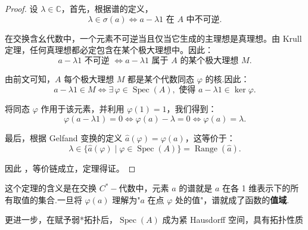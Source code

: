 \documentclass[math-font=lm, text-font=lm, math-style=TeX]{sjtureport}
\theoremstyle{plain}
\newtheorem*{proof}{证明}
\theoremstyle{plain}
\DeclareMathOperator{\Spec}{Spec}
\begin{document}
\begin{proof}
    设 $\lambda \in \mathbb{C}$，首先，根据谱的定义，
    \begin{equation*}
        \lambda \in \sigma(a) \Longleftrightarrow a - \lambda 1 \text{ 在 } A \text{ 中不可逆}.
    \end{equation*}
    
    在交换含幺代数中，一个元素不可逆当且仅当它生成的主理想是真理想。由 Krull 定理，任何真理想都必定包含在某个极大理想中。因此：
    \begin{equation*}
        a - \lambda 1 \text{ 不可逆 } \Longleftrightarrow a - \lambda 1 \text{ 属于 } A \text{ 的某个极大理想 } M.
    \end{equation*}

    由前文可知，$A$ 每个极大理想 $M$ 都是某个代数同态 $\varphi$ 的核.因此：
    \begin{equation*}
        a - \lambda 1 \in M \Longleftrightarrow \exists\, \varphi \in \Spec(A), \text{ 使得 } a - \lambda 1 \in \ker\varphi.
    \end{equation*}

    将同态 $\varphi$ 作用于该元素，并利用 $\varphi(1) = 1$，我们得到：
    \begin{equation*}
        \varphi(a - \lambda 1) = 0 \Longleftrightarrow \varphi(a) - \lambda = 0 \Longleftrightarrow \varphi(a) = \lambda.
    \end{equation*}

    最后，根据 Gelfand 变换的定义 $\widehat{a}(\varphi) = \varphi(a)$，这等价于：
    \begin{equation*}
        \lambda \in \{\widehat{a}(\varphi) \mid \varphi \in \Spec(A)\} = \operatorname{Range}(\widehat{a}).
    \end{equation*}
    
    因此 ，等价链成立，定理得证。
\end{proof}

这个定理的含义是在交换 $C^*-\!$代数中，元素 $a$ 的谱就是 $a$ 在各 1 维表示下的所有取值的集合.一旦将 $\varphi(a)$ 理解为"$a$ 在点 $\varphi$ 处的值"，谱就成了函数的\textbf{值域}.


更进一步，在赋予弱*拓扑后，$\Spec(A)$ 成为紧 Hausdorff 空间，具有拓扑性质
\end{document}
